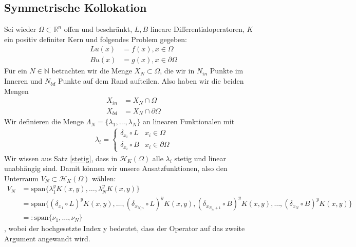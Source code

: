 \subsection{Symmetrische Kollokation}
Sei wieder $\Omega \subset \mathbb{R}^n$ offen und beschränkt, $L,B$ lineare Differentialoperatoren, $K$ ein positiv definiter Kern und folgendes Problem gegeben:
\begin{align*}
L u(x) &= f(x), x \in \Omega \\
B u(x) &= g(x), x \in \partial \Omega
\end{align*}
Für ein $N \in \mathbb{N}$ betrachten wir die Menge $X_N \subset \Omega$, die wir in $N_{in}$ Punkte im Inneren und $N_{bd}$ Punkte auf dem Rand aufteilen. Also haben wir die beiden Mengen
\begin{align*}
X_{in} &= X_N \cap \Omega\\
X_{bd} &= X_N \cap \partial \Omega
\end{align*}
Wir definieren die Menge $\Lambda_N = \{\lambda_1, \dots, \lambda_N\}$ an linearen Funktionalen mit
\begin{align*}
\lambda_i =
\begin{cases}
\delta_{x_i} \circ L & x_i \in \Omega\\
\delta_{x_i} \circ B & x_i \in \partial \Omega
\end{cases}
\end{align*}
Wir wissen aus Satz \ref{stetig}, dass in $\mathcal{H}_K(\Omega)$ alle $\lambda_i$ stetig und linear unabhängig sind. Damit können wir unsere Ansatzfunktionen, also den Unterraum $V_N \subset \mathcal{H}_K(\Omega)$ wählen:
\begin{align*}
V_N &= \text{span} \{\lambda_1^y K(x,y), \dots , \lambda_N^y K(x,y)\}\\
&= \text{span} \{(\delta_{x_1} \circ L)^y K(x,y), \dots, (\delta_{x_{N_in}} \circ L)^y K(x,y), (\delta_{x_{N_{in} + 1}} \circ B)^y K(x,y), \dots, (\delta_{x_{N}} \circ B)^y K(x,y)\}\\
&=: \text{span} \{\nu_1, \dots, \nu_N\}
\end{align*}
, wobei der hochgesetzte Index y bedeutet, dass der Operator auf das zweite Argument angewandt wird.

